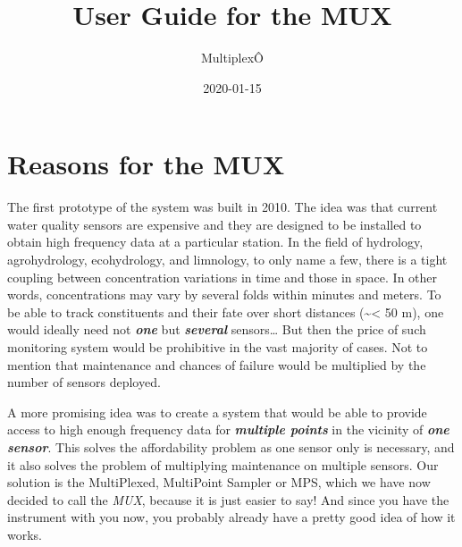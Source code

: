 \documentclass[]{book}
\title{User Guide for the MUX}
\author{MultiplexÔ}
\date{2020-01-15}
\begin{document}
\maketitle

{
\setcounter{tocdepth}{1}
\tableofcontents
}
\hypertarget{reasons-for-the-mux}{%
\chapter{Reasons for the MUX}\label{reasons-for-the-mux}}

The first prototype of the system was built in 2010. The idea was that current water quality sensors are expensive and they are designed to be installed to obtain high frequency data at a particular station. In the field of hydrology, agrohydrology, ecohydrology, and limnology, to only name a few, there is a tight coupling between concentration variations in time and those in space. In other words, concentrations may vary by several folds within minutes and meters. To be able to track constituents and their fate over short distances (\textasciitilde{}\textless{} 50 m), one would ideally need not \emph{\textbf{one}} but \emph{\textbf{several}} sensors\ldots{} But then the price of such monitoring system would be prohibitive in the vast majority of cases. Not to mention that maintenance and chances of failure would be multiplied by the number of sensors deployed.

A more promising idea was to create a system that would be able to provide access to high enough frequency data for \emph{\textbf{multiple points}} in the vicinity of \emph{\textbf{one sensor}}. This solves the affordability problem as one sensor only is necessary, and it also solves the problem of multiplying maintenance on multiple sensors. Our solution is the MultiPlexed, MultiPoint Sampler or MPS, which we have now decided to call the \emph{MUX}, because it is just easier to say! And since you have the instrument with you now, you probably already have a pretty good idea of how it works.
\end{document}

